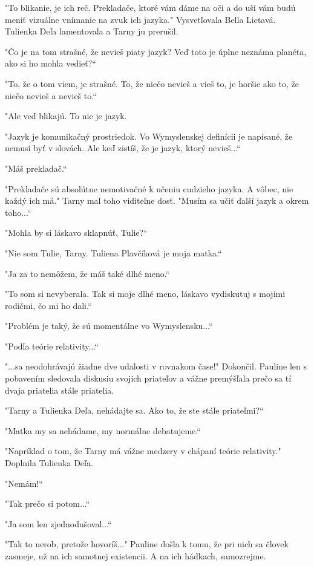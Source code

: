 \documentclass{book}
\begin{document}
"$ $To blikanie, je ich reč. Prekladače, ktoré vám dáme na oči a do uší vám budú meniť vizuálne vnímanie na zvuk ich jazyka."$ $ Vysvetľovala Bella Lietavá. Tulienka Deľa lamentovala a Tarny ju prerušil.

"$ $Čo je na tom strašné, že nevieš piaty jazyk? Veď toto je úplne neznáma planéta, ako si ho mohla vedieť?“

"$ $To, že o tom viem, je strašné. To, že niečo nevieš a vieš to, je horšie ako to, že niečo nevieš a nevieš to.“

"$ $Ale veď blikajú. To nie je jazyk.

 "$ $Jazyk je komunikačný prostriedok. Vo Wymyslenskej definícii je napísané, že nemusí byť v slovách. Ale keď zistíš, že je jazyk, ktorý nevieš...“

"$ $Máš prekladač.“

"$ $Prekladače sú absolútne nemotivačné k učeniu cudzieho jazyka. A vôbec, nie každý ich má."$ $ Tarny mal toho viditeľne dosť. "$ $Musím sa učiť ďalší jazyk a okrem toho...“

"$ $Mohla by si láskavo sklapnúť, Tulie?“

"$ $Nie som Tulie, Tarny. Tuliena Plavčíková je moja matka.“

"$ $Ja za to nemôžem, že máš také dlhé meno.“

"$ $To som si nevyberala. Tak si moje dlhé meno, láskavo vydiskutuj s mojimi rodičmi, čo mi ho dali.“

"$ $Problém je taký, že sú momentálne vo Wymyslensku...“

"$ $Podľa teórie relativity...“

"$ $...sa neodohrávajú žiadne dve udalosti v rovnakom čase!"$ $ Dokončil. Pauline len s pobavením sledovala diskusiu svojich priateľov a vážne premýšľala prečo sa tí dvaja priatelia stále priatelia.

"$ $Tarny a Tulienka Deľa, nehádajte sa. Ako to, že ste stále priateľmi?“

"$ $Matka my sa nehádame, my normálne debatujeme.“

"$ $Napríklad o tom, že Tarny má vážne medzery v chápaní teórie relativity."$ $ Doplnila Tulienka Deľa.

"$ $Nemám!“

"$ $Tak prečo si potom...“

"$ $Ja som len zjednodušoval...“

"$ $Tak to nerob, pretože hovoríš..."$ $ Pauline došla k tomu, že pri nich sa človek zasmeje, už na ich samotnej existencii. A na ich hádkach, samozrejme.
\end{document}

